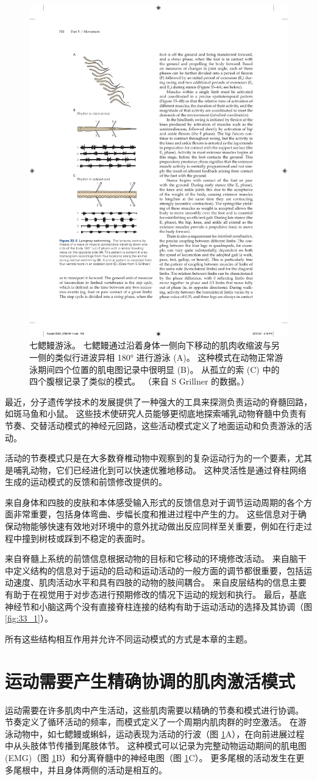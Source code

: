 \begin{figure}[htbp]
	\centering
	\includegraphics[width=0.4\linewidth]{chap33/fig_33_3}
	\caption{七鳃鳗游泳。 七鳃鳗通过沿着身体一侧向下移动的肌肉收缩波与另一侧的类似行进波异相 180° 进行游泳 (A)。 这种模式在动物正常游泳期间四个位置的肌电图记录中很明显 (B)。 从孤立的索 (C) 中的四个腹根记录了类似的模式。 （来自 S Grillner 的数据。）}
	\label{fig:33_3}
\end{figure}

最近，分子遗传学技术的发展提供了一种强大的工具来探测负责运动的脊髓回路，如斑马鱼和小鼠。 这些技术使研究人员能够更彻底地探索哺乳动物脊髓中负责有节奏、交替活动模式的神经元回路，这些活动模式定义了地面运动和负责游泳的活动。

活动的节奏模式只是在大多数脊椎动物中观察到的复杂运动行为的一个要素，尤其是哺乳动物，它们已经进化到可以快速优雅地移动。 这种灵活性是通过脊柱网络生成的运动模式的反馈和前馈修改提供的。

来自身体和四肢的皮肤和本体感受输入形式的反馈信息对于调节运动周期的各个方面非常重要，包括身体弯曲、步幅长度和推进过程中产生的力。 这些信息对于确保动物能够快速有效地对环境中的意外扰动做出反应同样至关重要，例如在行走过程中撞到树枝或踩到不稳定的表面时。

来自脊髓上系统的前馈信息根据动物的目标和它移动的环境修改活动。 来自脑干中定义结构的信息对于运动的启动和运动活动的一般方面的调节都很重要，包括运动速度、肌肉活动水平和具有四肢的动物的肢间耦合。 来自皮层结构的信息主要有助于在视觉用于对步态进行预期修改的情况下运动的规划和执行。 最后，基底神经节和小脑这两个没有直接脊柱连接的结构有助于运动活动的选择及其协调（图 \ref{fig:33_1}）。

所有这些结构相互作用并允许不同运动模式的方式是本章的主题。

\section{运动需要产生精确协调的肌肉激活模式}
运动需要在许多肌肉中产生活动，这些肌肉需要以精确的节奏和模式进行协调。 节奏定义了循环活动的频率，而模式定义了一个周期内肌肉群的时空激活。 在游泳动物中，如七鳃鳗或蝌蚪，运动表现为活动的行波（图 \ref{fig:33_3}A），在向前进展过程中从头肢体节传播到尾肢体节。 这种模式可以记录为完整动物运动期间的肌电图 (EMG)（图 \ref{fig:33_3}B）和分离脊髓中的神经电图（图 \ref{fig:33_3}C）。 更多尾根的活动发生在更多尾根中，并且身体两侧的活动是相互的。

